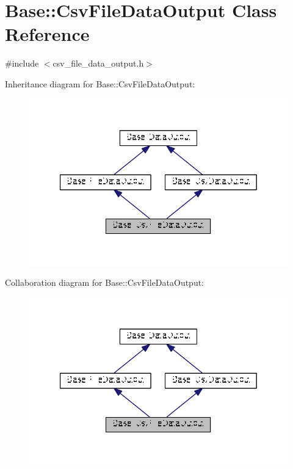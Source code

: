\hypertarget{classBase_1_1CsvFileDataOutput}{\section{Base\-:\-:Csv\-File\-Data\-Output Class Reference}
\label{classBase_1_1CsvFileDataOutput}
}


{\ttfamily \#include $<$csv\-\_\-file\-\_\-data\-\_\-output.\-h$>$}



Inheritance diagram for Base\-:\-:Csv\-File\-Data\-Output\-:\nopagebreak
\begin{figure}[H]
\begin{center}
\leavevmode
\includegraphics[width=329pt]{classBase_1_1CsvFileDataOutput__inherit__graph}
\end{center}
\end{figure}


Collaboration diagram for Base\-:\-:Csv\-File\-Data\-Output\-:\nopagebreak
\begin{figure}[H]
\begin{center}
\leavevmode
\includegraphics[width=329pt]{classBase_1_1CsvFileDataOutput__coll__graph}
\end{center}
\end{figure}
